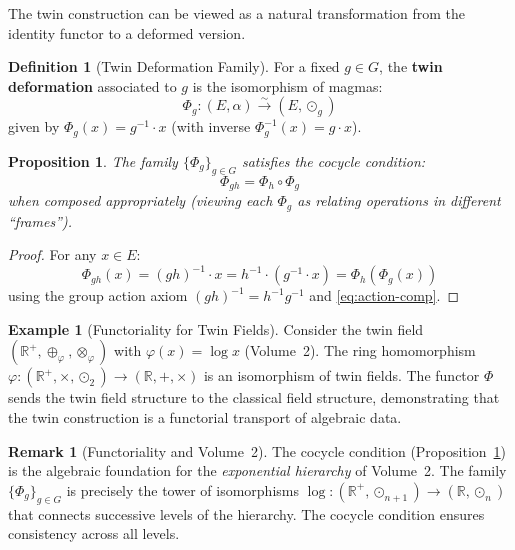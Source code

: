 \documentclass[11pt,a4paper,openany]{book}
\theoremstyle{plain}
\newtheorem{proposition}[theorem]{Proposition}
\theoremstyle{definition}
\newtheorem{definition}[theorem]{Definition}
\newtheorem{example}[theorem]{Example}
\newtheorem{remark}[theorem]{Remark}
\newcommand{\twing}[1]{\odot_{#1}}
\newcommand{\actspace}{E}
\newcommand{\groupG}{G}
\newcommand{\RR}{\mathbb{R}}
\begin{document}
The twin construction can be viewed as a natural transformation from the identity functor to a deformed version.

\begin{definition}[Twin Deformation Family]\label{def:twin-deformation}
For a fixed $g \in \groupG$, the \textbf{twin deformation} associated to $g$ is the isomorphism of magmas:
\[
\Phi_g : (\actspace, \alpha) \xrightarrow{\sim} (\actspace, \twing{g})
\]
given by $\Phi_g(x) = g^{-1} \cdot x$ (with inverse $\Phi_g^{-1}(x) = g \cdot x$).
\end{definition}

\begin{proposition}\label{prop:family-coherence}
The family $\{\Phi_g\}_{g \in \groupG}$ satisfies the cocycle condition:
\[
\Phi_{gh} = \Phi_h \circ \Phi_g
\]
when composed appropriately (viewing each $\Phi_g$ as relating operations in different ``frames'').
\end{proposition}

\begin{proof}
For any $x \in \actspace$:
\[
\Phi_{gh}(x) = (gh)^{-1} \cdot x = h^{-1} \cdot (g^{-1} \cdot x) = \Phi_h(\Phi_g(x))
\]
using the group action axiom $(gh)^{-1} = h^{-1}g^{-1}$ and \eqref{eq:action-comp}.
\end{proof}



\begin{example}[Functoriality for Twin Fields]\label{ex:functor-fields}
Consider the twin field $(\RR^+, \oplus_\varphi, \otimes_\varphi)$ with $\varphi(x) = \log x$ (Volume~2). The ring homomorphism $\varphi : (\RR^+, \times, \odot_2) \to (\RR, +, \times)$ is an isomorphism of twin fields. The functor $\Phi$ sends the twin field structure to the classical field structure, demonstrating that the twin construction is a functorial transport of algebraic data.
\end{example}

\begin{remark}[Functoriality and Volume~2]
The cocycle condition (Proposition~\ref{prop:family-coherence}) is the algebraic foundation for the \emph{exponential hierarchy} of Volume~2. The family $\{\Phi_g\}_{g \in \groupG}$ is precisely the tower of isomorphisms $\log : (\RR^+, \odot_{n+1}) \to (\RR, \odot_n)$ that connects successive levels of the hierarchy. The cocycle condition ensures consistency across all levels.
\end{remark}
\end{document}
